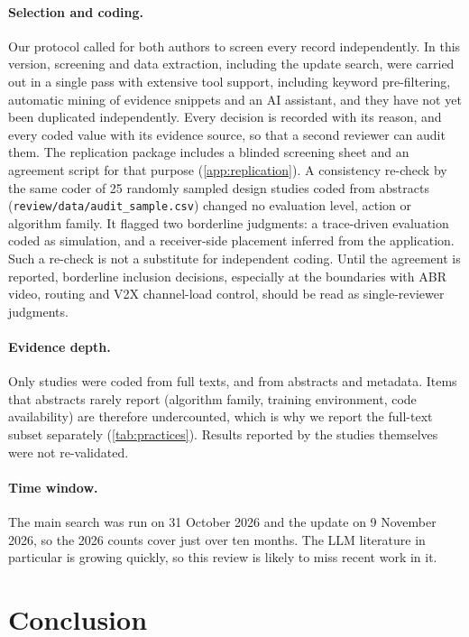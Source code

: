 \paragraph{Selection and coding.} Our protocol called for both authors to screen every record independently. In this version, screening and data extraction, including the update search, were carried out in a single pass with extensive tool support, including keyword pre-filtering, automatic mining of evidence snippets and an AI assistant, and they have not yet been duplicated independently. Every decision is recorded with its reason, and every coded value with its evidence source, so that a second reviewer can audit them. The replication package includes a blinded screening sheet and an agreement script for that purpose (\cref{app:replication}). A consistency re-check by the same coder of 25 randomly sampled design studies coded from abstracts (\texttt{review/data/audit\_sample.csv}) changed no evaluation level, action or algorithm family. It flagged two borderline judgments: a trace-driven evaluation coded as simulation, and a receiver-side placement inferred from the application. Such a re-check is not a substitute for independent coding. Until the agreement is reported, borderline inclusion decisions, especially at the boundaries with ABR video, routing and V2X channel-load control, should be read as single-reviewer judgments.

\paragraph{Evidence depth.} Only \nSrcFT{} studies were coded from full texts, and \nSrcAB{} from abstracts and metadata. Items that abstracts rarely report (algorithm family, training environment, code availability) are therefore undercounted, which is why we report the full-text subset separately (\cref{tab:practices}). Results reported by the studies themselves were not re-validated.

\paragraph{Time window.} The main search was run on 31 October 2026 and the update on 9 November 2026, so the 2026 counts cover just over ten months. The LLM literature in particular is growing quickly, so this review is likely to miss recent work in it.

\section{Conclusion}
\label{sec:conclusion}

